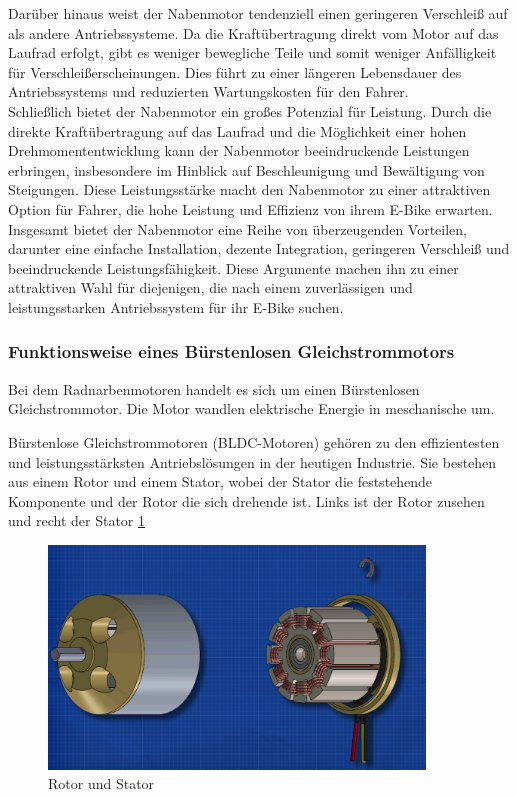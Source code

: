 Darüber hinaus weist der Nabenmotor tendenziell einen geringeren Verschleiß auf als andere Antriebssysteme. Da die Kraftübertragung direkt vom Motor auf das Laufrad erfolgt, gibt es weniger bewegliche Teile und somit weniger Anfälligkeit für Verschleißerscheinungen. Dies führt zu einer längeren Lebensdauer des Antriebssystems und reduzierten Wartungskosten für den Fahrer.\\

Schließlich bietet der Nabenmotor ein großes Potenzial für Leistung. Durch die direkte Kraftübertragung auf das Laufrad und die Möglichkeit einer hohen Drehmomententwicklung kann der Nabenmotor beeindruckende Leistungen erbringen, insbesondere im Hinblick auf Beschleunigung und Bewältigung von Steigungen. Diese Leistungsstärke macht den Nabenmotor zu einer attraktiven Option für Fahrer, die hohe Leistung und Effizienz von ihrem E-Bike erwarten.\\

Insgesamt bietet der Nabenmotor eine Reihe von überzeugenden Vorteilen, darunter eine einfache Installation, dezente Integration, geringeren Verschleiß und beeindruckende Leistungsfähigkeit. Diese Argumente machen ihn zu einer attraktiven Wahl für diejenigen, die nach einem zuverlässigen und leistungsstarken Antriebssystem für ihr E-Bike suchen.\\
\subsubsection*{Funktionsweise eines Bürstenlosen Gleichstrommotors}


Bei dem Radnarbenmotoren handelt es sich um einen Bürstenlosen Gleichstrommotor. Die Motor wandlen elektrische Energie in meschanische um.

Bürstenlose Gleichstrommotoren (BLDC-Motoren) gehören zu den effizientesten und leistungsstärksten Antriebslösungen in der heutigen Industrie. Sie bestehen aus einem Rotor und einem Stator, wobei der Stator die feststehende Komponente und der Rotor die sich drehende ist. Links ist der Rotor zusehen und recht der Stator \ref{fig:11}

\begin{figure}[h]
    \centering
    \includegraphics[width=10cm]{images/RotorStator.png}
    \caption{Rotor und Stator\cite{ingenieursmentalitat_burstenloser_2022}}%
    \label{fig:11}
\end{figure}

